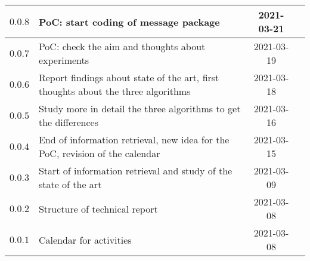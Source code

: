 \begin{longtable}{@{}cp{}cc@{}}
    \midrule

    $0.0.8$ & PoC: start coding of message package & 2021-03-21    \\

    \midrule

    $0.0.7$ & PoC: check the aim and thoughts about experiments & 2021-03-19    \\

    \midrule

    $0.0.6$ & Report findings about state of the art, first thoughts about the three algorithms & 2021-03-18    \\

    \midrule

    $0.0.5$ & Study more in detail the three algorithms to get the differences & 2021-03-16    \\

    \midrule

    $0.0.4$ & End of information retrieval, new idea for the PoC, revision of the calendar & 2021-03-15    \\

    \midrule

    $0.0.3$ & Start of information retrieval and study of the state of the art & 2021-03-09    \\
    
    \midrule

    $0.0.2$ & Structure of technical report & 2021-03-08    \\
    
    \midrule

    $0.0.1$ & Calendar for activities & 2021-03-08 \\

    \bottomrule
\end{longtable}